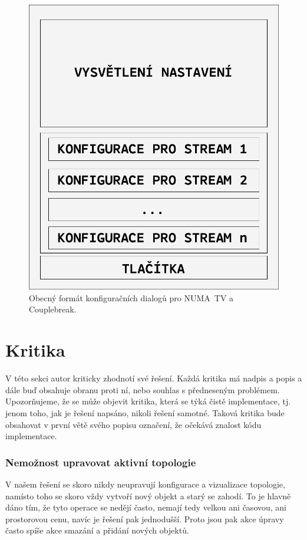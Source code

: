 \begin{figure}[p]\centering
    \includegraphics[width=140mm]{img/NUMATV/PerStreamCfg.pdf}
    \caption{Obecný formát konfiguračních dialogů pro NUMA~TV a Couplebreak.}
    \label{perstream-cfg}
\end{figure}

\section{Kritika}
V této sekci autor kriticky zhodnotí své řešení. Každá kritika má nadpis a popis a dále buď obsahuje obranu proti ní, nebo souhlas s předneseným problémem. Upozorňujeme, že se může objevit kritika, která se týká čistě implementace, tj. jenom toho, jak je řešení napsáno, nikoli řešení samotné. Taková kritika bude obsahovat v první větě svého popisu označení, že očekává znalost kódu implementace.

\subsubsection*{Nemožnost upravovat aktivní topologie}
V našem řešení se skoro nikdy neupravují konfigurace a vizualizace topologie, namísto toho se skoro vždy vytvoří nový objekt a starý se zahodí. To je hlavně dáno tím, že tyto operace se nedějí často, nemají tedy velkou ani časovou, ani prostorovou cenu, navíc je řešení pak jednodušší. Proto jsou pak akce úpravy často spíše akce smazání a přidání nových objektů.

